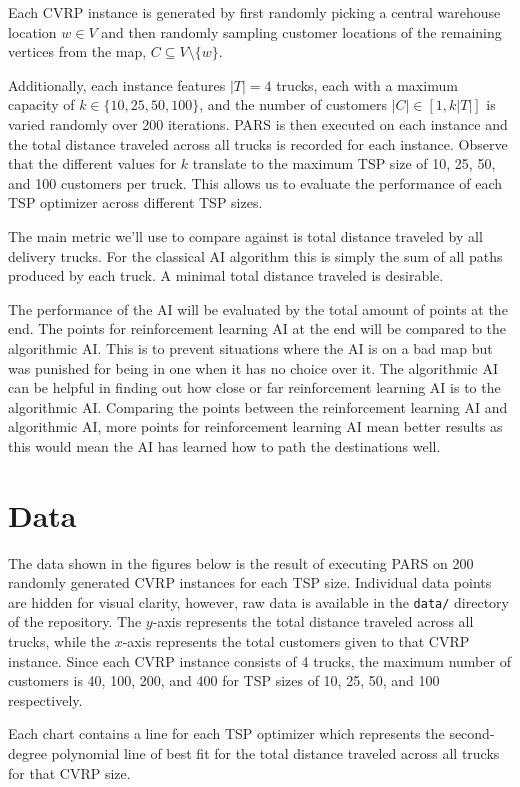 \documentclass[conference]{IEEEtran}
\begin{document}
Each CVRP instance is generated by first randomly picking a central warehouse location $w\in V$ and then randomly sampling customer locations of the remaining vertices from the map, $C\subseteq V\setminus\{w\}$.

Additionally, each instance features $|T|=4$ trucks, each with a maximum capacity of $k\in\{10,25,50,100\}$, and the number of customers $|C|\in[1,k|T|]$ is varied randomly over 200 iterations. PARS is then executed on each instance and the total distance traveled across all trucks is recorded for each instance. Observe that the different values for $k$ translate to the maximum TSP size of 10, 25, 50, and 100 customers per truck. This allows us to evaluate the performance of each TSP optimizer across different TSP sizes.

The main metric we'll use to compare against is total distance traveled by all delivery trucks. For the classical AI algorithm this is simply the sum of all paths produced by each truck. A minimal total distance traveled is desirable.

The performance of the AI will be evaluated by the total amount of points at the end. The points for reinforcement learning AI at the end will be compared to the algorithmic AI. This is to prevent situations where the AI is on a bad map but was punished for being in one when it has no choice over it. The algorithmic AI can be helpful in finding out how close or far reinforcement learning AI is to the algorithmic AI. Comparing the points between the reinforcement learning AI and algorithmic AI, more points for reinforcement learning AI mean better results as this would mean the AI has learned how to path the destinations well.

\section{Data}

The data shown in the figures below is the result of executing PARS on 200 randomly generated CVRP instances for each TSP size. Individual data points are hidden for visual clarity, however, raw data is available in the \texttt{data/} directory of the repository. The $y$-axis represents the total distance traveled across all trucks, while the $x$-axis represents the total customers given to that CVRP instance. Since each CVRP instance consists of 4 trucks, the maximum number of customers is 40, 100, 200, and 400 for TSP sizes of 10, 25, 50, and 100 respectively.

Each chart contains a line for each TSP optimizer which represents the second-degree polynomial line of best fit for the total distance traveled across all trucks for that CVRP size.
\end{document}
